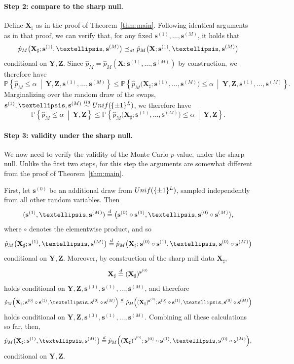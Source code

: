 \documentclass[12pt]{article}
\newcommand{\PPst}[2]{\mathbb{P}\left\{{#1}\  \middle| \ {#2}\right\}}
\newcommand{\eqd}{\stackrel{\textnormal{d}}{=}}
\newcommand{\iidsim}{\stackrel{\textnormal{iid}}{\sim}}
\newcommand{\bs}{\mathbf{s}}
\newcommand{\bX}{\mathbf{X}}
\newcommand{\bY}{\mathbf{Y}}
\newcommand{\bZ}{\mathbf{Z}}
\begin{document}
\paragraph{Step 2: compare to the sharp null.} 
Define $\bX_\sharp$ as in the proof of Theorem~\ref{thm:main}. Following identical arguments as in that proof, we can verify that, for any fixed $\bs^{(1)},\dots,\bs^{(M)}$, it holds that
\[\hat{p}_M\big(\bX_\sharp; \bs^{(1)},\dots,\bs^{(M)}\big) \preceq_{\rm st} \hat{p}_M\big(\bX; \bs^{(1)},\dots,\bs^{(M)}\big)\]
conditional on $\bY,\bZ$. Since $\hat{p}_M = \hat{p}_M(\bX;\bs^{(1)},\dots,\bs^{(M)})$ by construction, we therefore have
\[\PPst{\hat{p}_M\leq \alpha}{ \bY,\bZ,\bs^{(1)},\dots,\bs^{(M)}} \leq \PPst{\hat{p}_M\big(\bX_\sharp; \bs^{(1)},\dots,\bs^{(M)}\big)\leq \alpha}{ \bY,\bZ,\bs^{(1)},\dots,\bs^{(M)}}.\]
Marginalizing over the random draw of the swaps, $\bs^{(1)},\dots,\bs^{(M)}\iidsim \textnormal{Unif}(\{\pm 1\}^L)$, we therefore have
\[\PPst{\hat{p}_M\leq \alpha}{ \bY,\bZ} \leq \PPst{\hat{p}_M\big(\bX_\sharp; \bs^{(1)},\dots,\bs^{(M)}\big)\leq \alpha}{\bY,\bZ}.\]




\paragraph{Step 3: validity under the sharp null.} We now need to verify the validity of the Monte Carlo $p$-value, under the sharp null. Unlike the first two steps, for this step the arguments are somewhat different from the proof of Theorem~\ref{thm:main}.

First, let $\bs^{(0)}$ be an additional draw from $\textnormal{Unif}(\{\pm 1\}^L)$, sampled independently from all other random variables. Then
\[ 
(\bs^{(1)},\dots,\bs^{(M)})\eqd \big(\bs^{(0)}\circ \bs^{(1)},\dots,\bs^{(0)}\circ \bs^{(M)}\big),
\]
where $\circ$ denotes the elementwise product,
and so
\[
\hat{p}_M\big(\bX_\sharp; \bs^{(1)},\dots,\bs^{(M)}\big) \eqd \hat{p}_M\big(\bX_\sharp; \bs^{(0)}\circ \bs^{(1)},\dots,\bs^{(0)}\circ \bs^{(M)}\big)
\]
conditional on $\bY,\bZ$.
Moreover, by construction of the sharp null data $\bX_\sharp$, 
\[
\bX_\sharp\eqd (\bX_\sharp)^{\bs^{(0)}}
\]
holds conditional on $\bY,\bZ,\bs^{(0)},\bs^{(1)},\dots,\bs^{(M)}$, and therefore
\[
\hat{p}_M\Big(\bX_\sharp; \bs^{(0)}\circ \bs^{(1)},\dots,\bs^{(0)}\circ \bs^{(M)}\Big) \eqd \hat{p}_M\Big((\bX_\sharp)^{\bs^{(0)}}; \bs^{(0)}\circ \bs^{(1)},\dots,\bs^{(0)}\circ \bs^{(M)}\Big)
\]
holds conditional on $\bY,\bZ,\bs^{(0)},\bs^{(1)},\dots,\bs^{(M)}$. Combining all these calculations so far, then, 
\begin{equation}\label{eqn:eqd_monte_carlo}
\hat{p}_M\big(\bX_\sharp; \bs^{(1)},\dots,\bs^{(M)}\big) \eqd \hat{p}_M\Big((\bX_\sharp)^{\bs^{(0)}}; \bs^{(0)}\circ \bs^{(1)},\dots,\bs^{(0)}\circ \bs^{(M)}\Big),
\end{equation}
conditional on $\bY,\bZ$.
\end{document}
